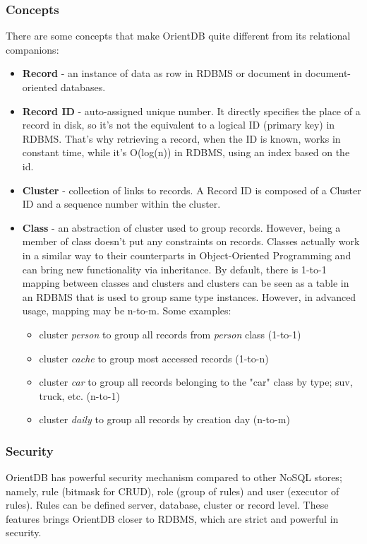 \subsubsection*{Concepts}

There are some concepts that make OrientDB quite different from its relational companions:

\begin{itemize}
  \item \textbf{Record} - an instance of data as row in RDBMS or document in document-oriented databases.
  \item \textbf{Record ID} - auto-assigned unique number. It directly specifies the place of a record in disk, so it's not the equivalent to a logical ID (primary key) in RDBMS. That's why retrieving a record, when the ID is known, works in constant time, while it's O(log(n)) in RDBMS, using an index based on the id.
  \item \textbf{Cluster} - collection of links to records. A Record ID is composed of a Cluster ID and a sequence number within the cluster.
  \item \textbf{Class} - an abstraction of cluster used to group records. However, being a member of class doesn't put any constraints on records. Classes actually work in a similar way to their counterparts in Object-Oriented Programming and can bring new functionality via inheritance. By default, there is 1-to-1 mapping between classes and clusters and clusters can be seen as a table in an RDBMS that is used to group same type instances. However, in advanced usage, mapping may be n-to-m. Some examples:
  \begin{itemize}
	\item cluster \textit{person} to group all records from \textit{person} class (1-to-1)
	\item cluster \textit{cache} to group most accessed records (1-to-n)
	\item cluster \textit{car} to group all records belonging to the "car" class by type; suv, truck, etc. (n-to-1)
	\item cluster \textit{daily} to group all records by creation day (n-to-m)
  \end{itemize}
\end{itemize}

\subsubsection*{Security}

OrientDB has powerful security mechanism compared to other NoSQL stores; namely, rule (bitmask for CRUD), role (group of rules) and user (executor of rules). Rules can be defined server, database, cluster or record level. These features brings OrientDB closer to RDBMS, which are strict and powerful in  security.

